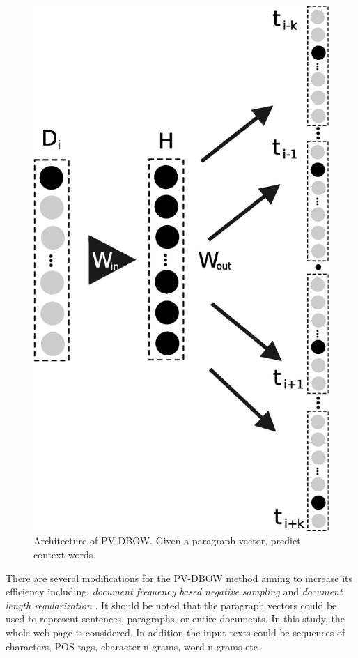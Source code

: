 \begin{figure}[t]
\begin{center} 
    \includegraphics[scale=0.50]{Figures/pvbow.eps}
    \caption{Architecture of PV-DBOW. Given a paragraph vector, predict context words.}
	\label{chap:word_embeddingss:fig:PVBOW_diagram}
\end{center}
\end{figure}

There are several modifications for the PV-DBOW method aiming to increase its efficiency including, \textit{document frequency based negative sampling} and \textit{document length regularization} \parencite{le2014distributed,posadas2017application}. It should be noted that the paragraph vectors could be used to represent  sentences, paragraphs, or entire documents. In this study, the whole web-page is considered. In addition the input texts could be sequences of characters, POS tags, character n-grams, word n-grams etc.

